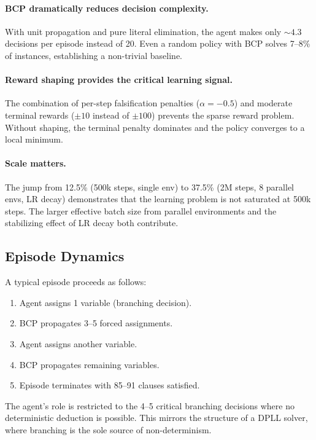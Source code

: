 \documentclass{article}
\begin{document}
\paragraph{BCP dramatically reduces decision complexity.}
With unit propagation and pure literal elimination, the agent makes only ${\sim}4.3$ decisions per episode instead of 20. Even a random policy with BCP solves 7--8\% of instances, establishing a non-trivial baseline.

\paragraph{Reward shaping provides the critical learning signal.}
The combination of per-step falsification penalties ($\alpha = -0.5$) and moderate terminal rewards ($\pm 10$ instead of $\pm 100$) prevents the sparse reward problem. Without shaping, the terminal penalty dominates and the policy converges to a local minimum.

\paragraph{Scale matters.}
The jump from 12.5\% (500k steps, single env) to 37.5\% (2M steps, 8 parallel envs, LR decay) demonstrates that the learning problem is not saturated at 500k steps. The larger effective batch size from parallel environments and the stabilizing effect of LR decay both contribute.

\subsection{Episode Dynamics}

A typical episode proceeds as follows:
\begin{enumerate}
    \item Agent assigns 1 variable (branching decision).
    \item BCP propagates 3--5 forced assignments.
    \item Agent assigns another variable.
    \item BCP propagates remaining variables.
    \item Episode terminates with 85--91 clauses satisfied.
\end{enumerate}

The agent's role is restricted to the 4--5 critical branching decisions where no deterministic deduction is possible. This mirrors the structure of a DPLL solver, where branching is the sole source of non-determinism.
\end{document}
